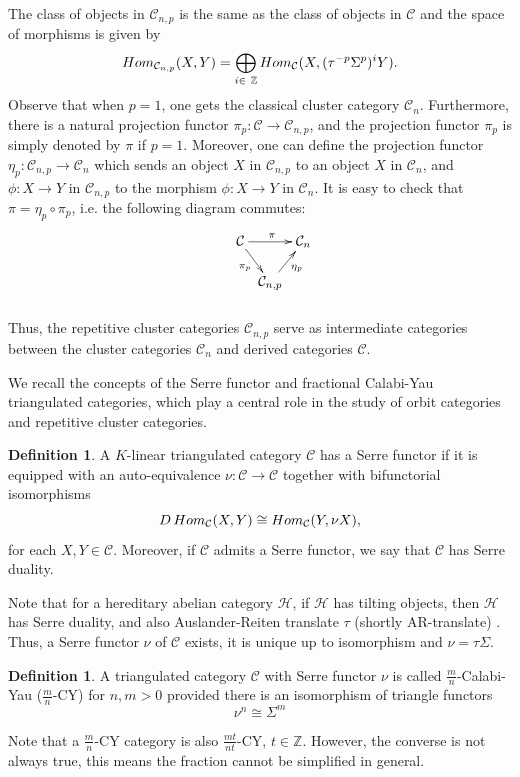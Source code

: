\documentclass[a4paper,reqno,11pt]{amsart}
\theoremstyle{definition}
\newtheorem{definition}[theorem]{Definition}
\def\C{\mathcal{C}}
\def\H{\mathcal {H}}
\providecommand{\Hom}{\mathop{\rm Hom}\nolimits}%
\begin{document}
The class of objects in $\C_{n,p}$ is the same as the class of objects in $\C$ and the space of morphisms is given by
$$\Hom_{\C_{n,p}}(X,Y)=\bigoplus_{i\in\ \mathbb{Z}} \Hom_{\C}(X,(\tau^{-p}\Sigma^p)^{i}Y).$$
Observe that when $p=1$, one gets the classical cluster category $\C_{n}$. Furthermore, there is a natural projection functor $\pi_p\colon\C\rightarrow\C_{n,p}$, and the projection functor $\pi_p$ is simply denoted by $\pi$ if $p=1$. Moreover, one can define the projection functor $\eta_p\colon\C_{n,p}\rightarrow\C_{n}$ which sends an object $X$ in $\C_{n,p}$ to an object $X$ in $\C_{n}$, and $\phi\colon X\rightarrow Y$ in $\C_{n,p}$ to the morphism $\phi\colon X\rightarrow Y$ in $\C_{n}$. It is easy to check that $\pi=\eta_p\circ\pi_p$, i.e. the following diagram commutes:
$$
{
\xymatrix@-7mm@C-0.01cm{
     &&\C \ar[rdd]_{\pi_p}\ar[rr]^{\pi} & & \C_{n} \\
 \\
 &&&\C_{n,p} \ar[ruu]_{\eta_p} \\
 \\
}
}
$$
Thus, the repetitive cluster categories $\C_{n,p}$ serve as intermediate categories between the cluster categories $\C_{n}$ and derived categories $\C$.
\vspace{1mm}

We recall the concepts of the Serre functor and fractional Calabi-Yau triangulated categories, which play a central role in the study of orbit categories and repetitive cluster categories.


\begin{definition}
A $K$-linear triangulated category $\C$ has a Serre functor if it is equipped with an auto-equivalence $\nu\colon \C\rightarrow \C$ together with bifunctorial isomorphisms
$$D\Hom_{\C}(X,Y)\cong\Hom_{\C}(Y,\nu X),$$
for each $X,Y\in\C$. Moreover, if $\C$ admits a Serre functor, we say that $\C$ has Serre duality.
\end{definition}
Note that for a hereditary abelian category $\H$, if $\H$ has tilting objects, then $\H$ has Serre duality, and also Auslander-Reiten translate $\tau$ (shortly AR-translate) \cite{HRS}. Thus, a Serre functor $\nu$ of $\C$ exists, it is unique up to isomorphism and $\nu=\tau\Sigma$.
\begin{definition}
A triangulated category $\C$ with Serre functor $\nu$ is called $\frac{m}{n}$-Calabi-Yau ($\frac{m}{n}$-CY) for $n,m>0$ provided there is an isomorphism of triangle functors
$$\nu^n\cong \Sigma^m$$
\end{definition}
Note that a $\frac{m}{n}$-CY category is also  $\frac{mt}{nt}$-CY, $t\in\mathbb{Z}$. However, the converse is not always true, this means the fraction cannot be simplified in general.
\end{document}
